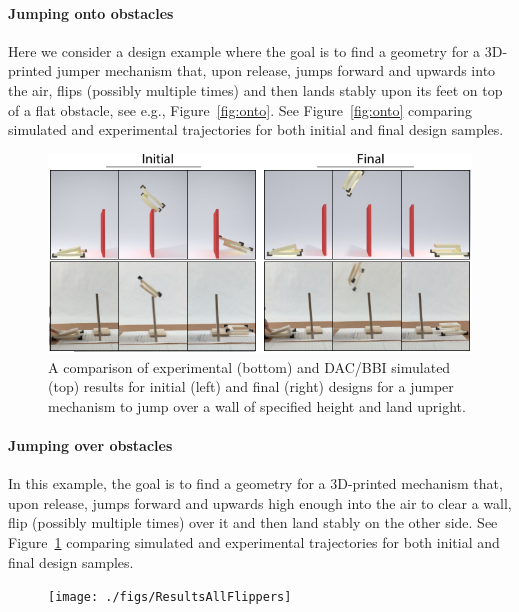 \paragraph{Jumping onto obstacles}
Here we consider a design example where the goal is  
to find a geometry for a 3D-printed jumper mechanism that, upon release, jumps forward and upwards into the air, flips (possibly multiple times) and then lands stably upon its feet on top of a flat obstacle, see e.g., Figure~\ref{fig:onto}. 
See Figure~\ref{fig:onto} comparing simulated and experimental trajectories for both initial and final design samples.

\begin{figure}[h!]
\includegraphics[width=\columnwidth]{./figs/ResultsOver.pdf}
\caption{A comparison of experimental (bottom) and DAC/BBI simulated (top) results for initial (left) and final (right) designs for a jumper mechanism to jump over a wall of specified height and land upright.}
\label{fig:over}	
\end{figure}

\paragraph{Jumping over obstacles}
In this example, the goal is to find a geometry for a 3D-printed mechanism that, upon release, jumps forward and upwards high enough into the air to clear a wall, flip (possibly multiple times) over it and then land stably on the other side. 
See Figure~\ref{fig:over} comparing simulated and experimental trajectories for both initial and final design samples.

\begin{figure}[h!]
\texttt{[image: ./figs/ResultsAllFlippers]}
\caption{}
\label{fig:more_flippers}	
\end{figure}

